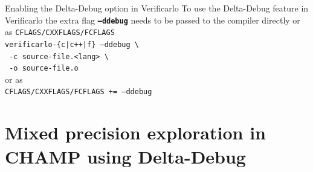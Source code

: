 \documentclass[aspectratio=169]{beamer}
\begin{document}
    \begin{frame}{Enabling the Delta-Debug option in Verificarlo}
      To use the Delta-Debug feature in Verificarlo the extra flag \textbf{\texttt{--ddebug}} needs to be passed to the compiler directly or as \texttt{CFLAGS/CXXFLAGS/FCFLAGS}\vspace{1em}\\
      \texttt{verificarlo-\{c|c++|f\} --ddebug \textbackslash}\\
      \texttt{  -c source-file.<lang> \textbackslash}\\
      \texttt{  -o source-file.o}\vspace{1em}\\
      or as\vspace{1em}\\
      \texttt{CFLAGS/CXXFLAGS/FCFLAGS += --ddebug}
          
    \end{frame}
    
    \section{Mixed precision exploration in CHAMP using Delta-Debug}
    
\end{document}
